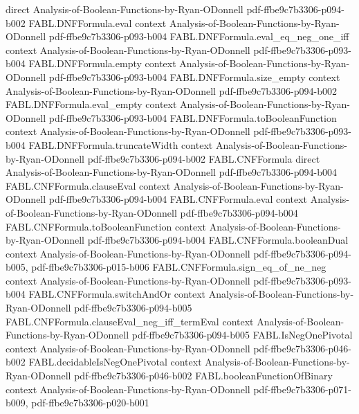 \begin{theorem}
  {direct}
  {Analysis-of-Boolean-Functions-by-Ryan-ODonnell}
  {pdf-ffbe9c7b3306-p094-b002}
\proofstep
  {FABL.DNFFormula.eval}
  {context}
  {Analysis-of-Boolean-Functions-by-Ryan-ODonnell}
  {pdf-ffbe9c7b3306-p093-b004}
\proofstep
  {FABL.DNFFormula.eval_eq_neg_one_iff}
  {context}
  {Analysis-of-Boolean-Functions-by-Ryan-ODonnell}
  {pdf-ffbe9c7b3306-p093-b004}
\proofstep
  {FABL.DNFFormula.empty}
  {context}
  {Analysis-of-Boolean-Functions-by-Ryan-ODonnell}
  {pdf-ffbe9c7b3306-p093-b004}
\proofstep
  {FABL.DNFFormula.size_empty}
  {context}
  {Analysis-of-Boolean-Functions-by-Ryan-ODonnell}
  {pdf-ffbe9c7b3306-p094-b002}
\proofstep
  {FABL.DNFFormula.eval_empty}
  {context}
  {Analysis-of-Boolean-Functions-by-Ryan-ODonnell}
  {pdf-ffbe9c7b3306-p093-b004}
\proofstep
  {FABL.DNFFormula.toBooleanFunction}
  {context}
  {Analysis-of-Boolean-Functions-by-Ryan-ODonnell}
  {pdf-ffbe9c7b3306-p093-b004}
\proofstep
  {FABL.DNFFormula.truncateWidth}
  {context}
  {Analysis-of-Boolean-Functions-by-Ryan-ODonnell}
  {pdf-ffbe9c7b3306-p094-b002}
\proofstep
  {FABL.CNFFormula}
  {direct}
  {Analysis-of-Boolean-Functions-by-Ryan-ODonnell}
  {pdf-ffbe9c7b3306-p094-b004}
\proofstep
  {FABL.CNFFormula.clauseEval}
  {context}
  {Analysis-of-Boolean-Functions-by-Ryan-ODonnell}
  {pdf-ffbe9c7b3306-p094-b004}
\proofstep
  {FABL.CNFFormula.eval}
  {context}
  {Analysis-of-Boolean-Functions-by-Ryan-ODonnell}
  {pdf-ffbe9c7b3306-p094-b004}
\proofstep
  {FABL.CNFFormula.toBooleanFunction}
  {context}
  {Analysis-of-Boolean-Functions-by-Ryan-ODonnell}
  {pdf-ffbe9c7b3306-p094-b004}
\proofstep
  {FABL.CNFFormula.booleanDual}
  {context}
  {Analysis-of-Boolean-Functions-by-Ryan-ODonnell}
  {pdf-ffbe9c7b3306-p094-b005,
    pdf-ffbe9c7b3306-p015-b006}
\proofstep
  {FABL.CNFFormula.sign_eq_of_ne_neg}
  {context}
  {Analysis-of-Boolean-Functions-by-Ryan-ODonnell}
  {pdf-ffbe9c7b3306-p093-b004}
\proofstep
  {FABL.CNFFormula.switchAndOr}
  {context}
  {Analysis-of-Boolean-Functions-by-Ryan-ODonnell}
  {pdf-ffbe9c7b3306-p094-b005}
\proofstep
  {FABL.CNFFormula.clauseEval_neg_iff_termEval}
  {context}
  {Analysis-of-Boolean-Functions-by-Ryan-ODonnell}
  {pdf-ffbe9c7b3306-p094-b005}
\proofstep
  {FABL.IsNegOnePivotal}
  {context}
  {Analysis-of-Boolean-Functions-by-Ryan-ODonnell}
  {pdf-ffbe9c7b3306-p046-b002}
\proofstep
  {FABL.decidableIsNegOnePivotal}
  {context}
  {Analysis-of-Boolean-Functions-by-Ryan-ODonnell}
  {pdf-ffbe9c7b3306-p046-b002}
\proofstep
  {FABL.booleanFunctionOfBinary}
  {context}
  {Analysis-of-Boolean-Functions-by-Ryan-ODonnell}
  {pdf-ffbe9c7b3306-p071-b009,
    pdf-ffbe9c7b3306-p020-b001}

\end{theorem}
